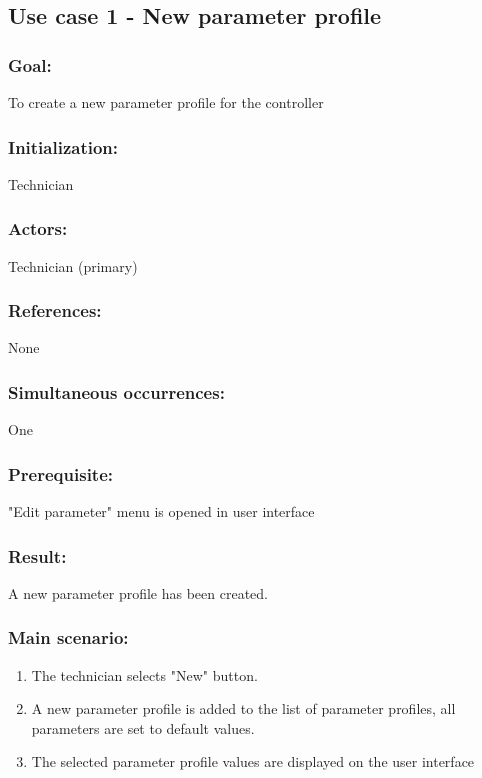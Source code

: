 \begin{framed}
\subsection{Use case 1 - New parameter profile}
\subsubsection*{Goal:}
To create a new parameter profile for the controller

\subsubsection*{Initialization:}
Technician

\subsubsection*{Actors:}
Technician (primary)

\subsubsection*{References:}
None

\subsubsection*{Simultaneous occurrences:}
One

\subsubsection*{Prerequisite:}
"Edit parameter" menu is opened in user interface

\subsubsection*{Result:}
A new parameter profile has been created.

\subsubsection*{Main scenario:}
\begin{enumerate}
	\item The technician selects "New" button.
	\item A new parameter profile is added to the list of parameter profiles, all parameters are set to default values.
	\item The selected parameter profile values are displayed on the user interface
\end{enumerate}	
\end{framed}

